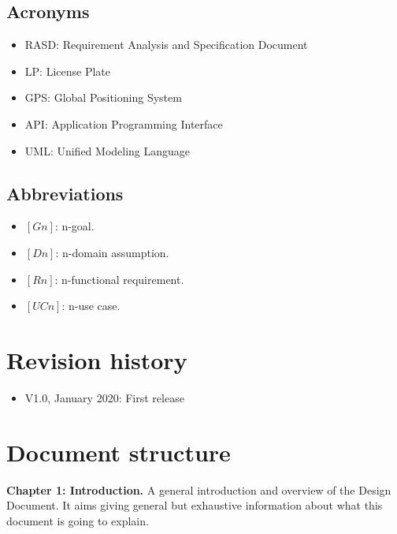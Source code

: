 \documentclass[../RASD.tex]{subfiles}
\begin{document}
    \subsection{Acronyms}\label{subsec:acronyms}
    \begin{itemize}
        \item RASD: Requirement Analysis and Specification Document
        \item LP: License Plate
        \item GPS: Global Positioning System
        \item API: Application Programming Interface
        \item UML: Unified Modeling Language
    \end{itemize}

    \subsection{Abbreviations}\label{subsec:abbreviations}
    \begin{itemize}
        \item $[Gn]$: n-goal.
        \item $[Dn]$: n-domain assumption.
        \item $[Rn]$: n-functional requirement.
        \item $[UCn]$: n-use case.
    \end{itemize}
    \newpage
    \section{Revision history}\label{sec:revision-history}
    \begin{itemize}
        \item V1.0, January  2020: First release
    \end{itemize}
    \section{Document structure}\label{sec:document-structure}
    \textbf{Chapter 1: Introduction.}
    A general introduction and overview of the Design Document.
    It aims giving general but exhaustive information about what this document is going to explain.
    
\end{document}
